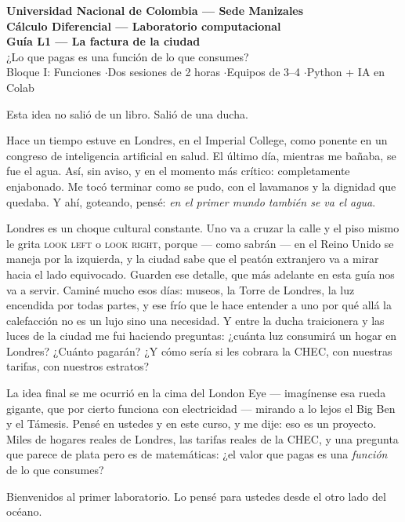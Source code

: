 \documentclass[12pt,letterpaper]{article}
\begin{document}
\begin{center}
    {\Large \textbf{Universidad Nacional de Colombia --- Sede Manizales}}\\
    {\large \textbf{Cálculo Diferencial --- Laboratorio computacional}}\\[0.8em]
    {\LARGE \textbf{Guía L1 --- La factura de la ciudad}}\\[0.4em]
    {\large ¿Lo que pagas es una función de lo que consumes?}\\[0.5em]
    {\normalsize Bloque I: Funciones \quad$\cdot$\quad Dos sesiones de 2 horas \quad$\cdot$\quad Equipos de 3--4 \quad$\cdot$\quad Python + IA en Colab}
\end{center}

\begin{cajabitacora}
Esta idea no salió de un libro. Salió de una ducha.

Hace un tiempo estuve en Londres, en el Imperial College, como ponente en un congreso de inteligencia artificial en salud. El último día, mientras me bañaba, se fue el agua. Así, sin aviso, y en el momento más crítico: completamente enjabonado. Me tocó terminar como se pudo, con el lavamanos y la dignidad que quedaba. Y ahí, goteando, pensé: \emph{en el primer mundo también se va el agua}.

Londres es un choque cultural constante. Uno va a cruzar la calle y el piso mismo le grita \textsc{look left} o \textsc{look right}, porque --- como sabrán --- en el Reino Unido se maneja por la izquierda, y la ciudad sabe que el peatón extranjero va a mirar hacia el lado equivocado. Guarden ese detalle, que más adelante en esta guía nos va a servir. Caminé mucho esos días: museos, la Torre de Londres, la luz encendida por todas partes, y ese frío que le hace entender a uno por qué allá la calefacción no es un lujo sino una necesidad. Y entre la ducha traicionera y las luces de la ciudad me fui haciendo preguntas: ¿cuánta luz consumirá un hogar en Londres? ¿Cuánto pagarán? ¿Y cómo sería si les cobrara la CHEC, con nuestras tarifas, con nuestros estratos?

La idea final se me ocurrió en la cima del London Eye --- imagínense esa rueda gigante, que por cierto funciona con electricidad --- mirando a lo lejos el Big Ben y el Támesis. Pensé en ustedes y en este curso, y me dije: eso es un proyecto. Miles de hogares reales de Londres, las tarifas reales de la CHEC, y una pregunta que parece de plata pero es de matemáticas: ¿el valor que pagas es una \emph{función} de lo que consumes?

Bienvenidos al primer laboratorio. Lo pensé para ustedes desde el otro lado del océano.
\end{cajabitacora}
\end{document}
